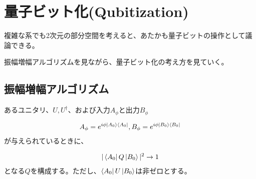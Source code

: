 \documentclass[platex,dvipdfmx]{jlreq}			%
\begin{document}

\section{量子ビット化(Qubitization)}
複雑な系でも2次元の部分空間を考えると、あたかも量子ビットの操作として議論できる。

振幅増幅アルゴリズムを見ながら、量子ビット化の考え方を見ていく。

\subsection{振幅増幅アルゴリズム}
あるユニタリ、$U, U^{\dagger}$、および入力$A_{\phi}$と出力$B_\phi$

\begin{align}
    A_{\phi} = e^{i \phi \ket{A_0}\bra{A_0}}, B_{\phi} = e^{i \phi \ket{B_0}\bra{B_0}}
\end{align}
が与えられているときに、

\begin{align}
    |\bra{A_0} Q \ket{B_0}|^2 \rightarrow 1
\end{align}
となる$Q$を構成する。ただし、$\bra{A_0} U \ket{B_0}$は非ゼロとする。
\end{document}
